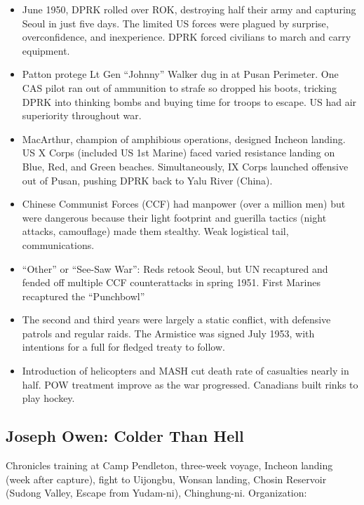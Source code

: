 \documentclass[
]{article}
\begin{document}
\begin{itemize}
\item
  June 1950, DPRK rolled over ROK, destroying half their army and
  capturing Seoul in just five days. The limited US forces were plagued
  by surprise, overconfidence, and inexperience. DPRK forced civilians
  to march and carry equipment.
\item
  Patton protege Lt Gen ``Johnny'' Walker dug in at Pusan Perimeter. One
  CAS pilot ran out of ammunition to strafe so dropped his boots,
  tricking DPRK into thinking bombs and buying time for troops to
  escape. US had air superiority throughout war.
\item
  MacArthur, champion of amphibious operations, designed Incheon
  landing. US X Corps (included US 1st Marine) faced varied resistance
  landing on Blue, Red, and Green beaches. Simultaneously, IX Corps
  launched offensive out of Pusan, pushing DPRK back to Yalu River
  (China).
\item
  Chinese Communist Forces (CCF) had manpower (over a million men) but
  were dangerous because their light footprint and guerilla tactics
  (night attacks, camouflage) made them stealthy. Weak logistical tail,
  communications.
\item
  ``Other'' or ``See-Saw War'': Reds retook Seoul, but UN recaptured and
  fended off multiple CCF counterattacks in spring 1951. First Marines
  recaptured the ``Punchbowl''
\item
  The second and third years were largely a static conflict, with
  defensive patrols and regular raids. The Armistice was signed July
  1953, with intentions for a full for fledged treaty to follow.
\item
  Introduction of helicopters and MASH cut death rate of casualties
  nearly in half. POW treatment improve as the war progressed. Canadians
  built rinks to play hockey.
\end{itemize}

\hypertarget{joseph-owen-colder-than-hell}{%
\subsection{Joseph Owen: Colder Than
Hell}\label{joseph-owen-colder-than-hell}}

Chronicles training at Camp Pendleton, three-week voyage, Incheon
landing (week after capture), fight to Uijongbu, Wonsan landing, Chosin
Reservoir (Sudong Valley, Escape from Yudam-ni), Chinghung-ni.
Organization:
\end{document}
